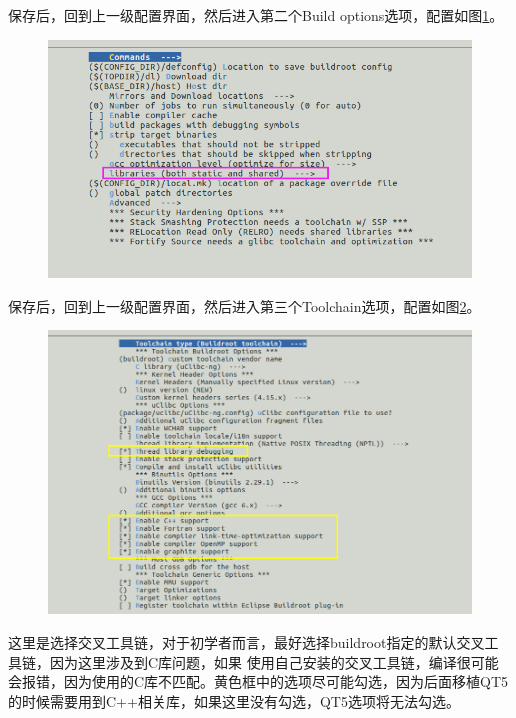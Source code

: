 保存后，回到上一级配置界面，然后进入第二个Build options选项，配置如图\ref{fig:buildoptions}。
\begin{figure}[htbp]
	\centering
	\includegraphics[width=1\linewidth]{chapter2/img/buildoptions}
	\caption{}
	\label{fig:buildoptions}
\end{figure}
保存后，回到上一级配置界面，然后进入第三个Toolchain选项，配置如图\ref{fig:buildtoolschains}。
\begin{figure}[htbp]
	\centering
	\includegraphics[width=1\linewidth]{chapter2/img/buildtoolschains}
	\caption{}
	\label{fig:buildtoolschains}
\end{figure}
这里是选择交叉工具链，对于初学者而言，最好选择buildroot指定的默认交叉工具链，因为这里涉及到C库问题，如果
使用自己安装的交叉工具链，编译很可能会报错，因为使用的C库不匹配。黄色框中的选项尽可能勾选，因为后面移植QT5
的时候需要用到C++相关库，如果这里没有勾选，QT5选项将无法勾选。

